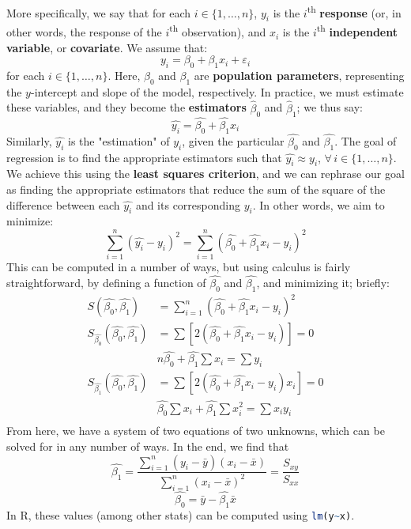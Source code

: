\documentclass[12pt]{article}
\begin{document}
More specifically, we say that for each $i \in \{1, \dots, n\}$, $y_i$ is the $i$\textsuperscript{th} \textbf{response} (or, in other words, the response of the $i$\textsuperscript{th} observation), and $x_i$ is the $i$\textsuperscript{th} \textbf{independent variable}, or \textbf{covariate}. We assume that:\[y_i = \beta_0 + \beta_1 x_i + \varepsilon_i\] for each $i \in \{1, \dots, n\}$. Here, $\beta_0$ and $\beta_1$ are \textbf{population parameters}, representing the $y$-intercept and slope of the model, respectively. In practice, we must estimate these variables, and they become the \textbf{estimators} $\hat{\beta}_0$ and $\hat{\beta}_1$; we thus say:\[\hat{y_i} = \hat{\beta_0} + \hat{\beta_1}x_i\] Similarly, $\hat{y_i}$ is the "estimation" of $y_i$, given the particular $\hat{\beta_0}$ and $\hat{\beta_1}$. The goal of regression is to find the appropriate estimators such that $\hat{y_i} \approx y_i$, $\forall \,i \in \{1, \dots, n\}$. We achieve this using the \textbf{least squares criterion}, and we can rephrase our goal as finding the appropriate estimators that reduce the sum of the square of the difference between each $\hat{y_i}$ and its corresponding $y_i$. In other words, we aim to minimize:\[\sum_{i=1}^n(\hat{y_i} - y_i)^2 = \sum_{i=1}^n(\hat{\beta_0} + \hat{\beta_1} x_i - y_i)^2\] This can be computed in a number of ways, but using calculus is fairly straightforward, by defining a function of $\hat{\beta_0}$ and $\hat{\beta_1}$, and minimizing it; briefly: \begin{align*}
    S(\hat{\beta_0}, \hat{\beta_1}) &= \sum_{i=1}^n(\hat{\beta_0} + \hat{\beta_1} x_i - y_i)^2\\
    S_{\hat{\beta_0}}(\hat{\beta_0}, \hat{\beta_1}) &= \sum [2(\hat{\beta_0} + \hat{\beta_1} x_i - y_i)] = 0\\
    & n \hat{\beta_0} + \hat{\beta_1} \sum x_i = \sum y_i\\
    S_{\hat{\beta_1}}(\hat{\beta_0}, \hat{\beta_1}) &= \sum [2(\hat{\beta_0} + \hat{\beta_1} x_i - y_i)x_i] = 0\\
    & \hat{\beta_0} \sum x_i + \hat{\beta_1} \sum x_i^2 = \sum x_i y_i\\
\end{align*} From here, we have a system of two equations of two unknowns, which can be solved for in any number of ways. In the end, we find that \[\hat{\beta_1} = \frac{\sum_{i=1}^n(y_i-\bar{y})(x_i-\bar{x})}{\sum_{i=1}^n(x_i - \bar{x})^2}  = \frac{S_{xy}}{S_{xx}}\]\[\hat{\beta_0} = \bar{y} - \hat{\beta_1} \bar{x}\] In R, these values (among other stats) can be computed using \lstinline[language=R]{lm(y~x)}.
\end{document}
